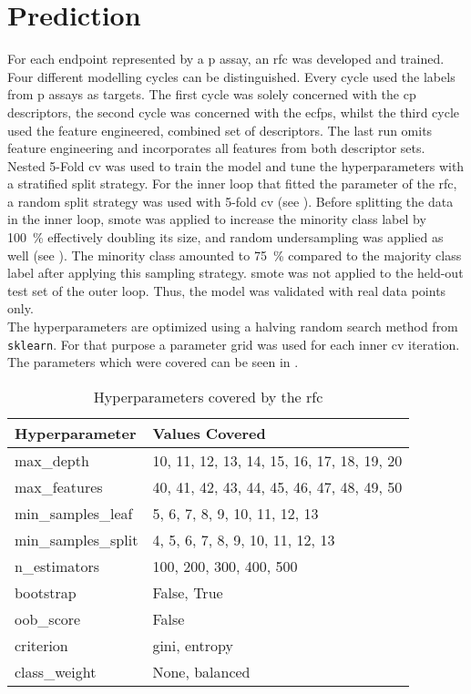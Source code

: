 \section{Prediction}\label{sec:randomforest}
For each endpoint represented by a \acl{p} assay, an \ac{rfc} was developed and trained. Four different modelling cycles can be distinguished. Every cycle used the labels from \acl{p} assays as targets. The first cycle was solely concerned with the \ac{cp} descriptors, the second cycle was concerned with the \acp{ecfp}, whilst the third cycle used the feature engineered, combined set of descriptors. The last run omits feature engineering and incorporates all features from both descriptor sets.\\
Nested \num{5}-Fold \ac{cv} was used to train the model and tune the hyperparameters with a stratified split strategy. For the inner loop that fitted the parameter of the \ac{rfc}, a random split strategy was used with \num{5}-fold \ac{cv} (see ). Before splitting the data in the inner loop, \ac{smote} was applied to increase the minority class label by \SI{100}{\percent} effectively doubling its size, and random undersampling was applied as well (see ). The minority class amounted to \SI{75}{\percent} compared to the majority class label after applying this sampling strategy. \ac{smote} was not applied to the held-out test set of the outer loop. Thus, the model was validated with real data points only.\\
The hyperparameters are optimized using a halving random search method from \texttt{sklearn}.\cite{Bergstra2012,Pedregosa2012} For that purpose a parameter grid was used for each inner \ac{cv} iteration. The parameters which were covered can be seen in . 
\begin{table}[H]
	\centering
	\caption[Hyperparameters covered by the \ac{rfc}]{Hyperparameters covered by the \ac{rfc}}
	\label{tab:hyperparametergrid}
	\begin{tabularx}{0.75\textwidth}{ll}
		\toprule
		Hyperparameter & Values Covered\\
		\midrule
		max\_depth& 10, 11, 12, 13, 14, 15, 16, 17, 18, 19, 20\\
		max\_features& 40, 41, 42, 43, 44, 45, 46, 47, 48, 49, 50\\
		min\_samples\_leaf& 5, 6, 7, 8, 9, 10, 11, 12, 13\\
		min\_samples\_split& 4, 5, 6, 7, 8, 9, 10, 11, 12, 13\\
		n\_estimators& 100, 200, 300, 400, 500\\
		bootstrap& False, True\\
		oob\_score& False\\
		criterion& gini, entropy\\
		class\_weight& None, balanced\\
		\bottomrule
	\end{tabularx}
\end{table}\noindent
